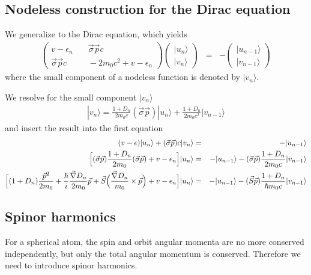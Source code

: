 \documentclass[11pt,a4paper]{report}
\begin{document}
\subsection{Nodeless construction for the Dirac equation}
We generalize  to the Dirac equation, which yields
\begin{eqnarray}
\left(\begin{array}{cc}
v-\epsilon_n &\quad \vec{\sigma}\vec{p}c\\
\vec{\sigma}\vec{p}c &\quad -2m_0c^2+v-\epsilon_n\end{array}\right)
\left(\begin{array}{c}|u_n\rangle\\|v_n\rangle\end{array}\right)
&=&-\left(\begin{array}{c}|u_{n-1}\rangle\\|v_{n-1}\rangle\end{array}\right)
\end{eqnarray}
where the small component of a nodeless function is denoted by $|v_n\rangle$.

We resolve for the small component $|v_n\rangle$
\begin{eqnarray}
|v_n\rangle=\frac{1+D_n}{2m_0c}(\vec{\sigma}\vec{p})|u_n\rangle
+\frac{1+D_n}{2m_0c^2}|v_{n-1}\rangle
\label{eq:nodelessdiracsmall}
\end{eqnarray}
and insert the result into the first equation
\begin{eqnarray}
(v-\epsilon)|u_n\rangle
+(\vec{\sigma}\vec{p})c|v_n\rangle&=&-|u_{n-1}\rangle 
\nonumber\\
\Bigl[(\vec{\sigma}\vec{p})
\frac{1+D_n}{2m_0}(\vec{\sigma}\vec{p})
+v-\epsilon_n\Bigr]|u_n\rangle
&=&-|u_{n-1}\rangle -(\vec{\sigma}\vec{p})\frac{1+D_n}{2m_0c}|v_{n-1}\rangle
\nonumber\\
\Bigl[
(1+D_n)\frac{\vec{p}^2}{2m_0}
+\frac{\hbar}{i}
\frac{\vec{\nabla}D_n}{2m_0}\vec{p}
+\vec{S}\Bigl(\frac{\vec{\nabla}D_n}{m_0}\times\vec{p}\Bigr)
+v-\epsilon_n\Bigr]|u_n\rangle
&=&-|u_{n-1}\rangle -(\vec{S}\vec{p})\frac{1+D_n}{\hbar m_0c}|v_{n-1}\rangle
\nonumber\\
\label{eq:nodelessdirac1}
\end{eqnarray}


\subsection{Spinor harmonics}
For a spherical atom, the spin and orbit angular momenta are no more
conserved independently, but only the total angular momentum is
conserved. Therefore we need to introduce spinor harmonics.
\end{document}
